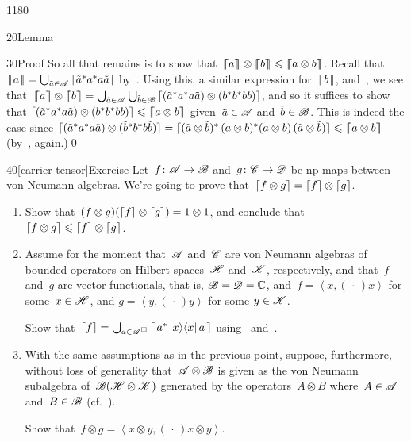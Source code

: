 \begin{parsec}{1180}
\begin{point}{20}{Lemma}
\begin{point}{30}{Proof}
So all that remains is to show that~$\cceil{a}\otimes\cceil{b}
\leq \cceil{a\otimes b}$.
Recall that~$\left\lceil\!\!\left\lceil a\right\rceil\!\!\right\rceil= \bigcup_{\tilde{a}\in\mathscr{A}}
\left\lceil\tilde{a}^* a^*a\tilde{a}\right\rceil$
by~.
Using this,  a similar
expression for~$\left\lceil\!\!\left\lceil b\right\rceil\!\!\right\rceil$,
and~,
we see that~$\cceil{a}\otimes \cceil{b}
=\bigcup_{\tilde{a}\in\scrA}
\bigcup_{\tilde{b}\in\scrB}
\ceil{ \smash{(\tilde{a}^*a^*a\tilde{a})
\otimes (\tilde{b}^*b^*b\tilde{b})} }$,
and so it suffices to show that 
$\left\lceil\smash{(\tilde{a}^*a^*a\tilde{a})
\otimes (\tilde{b}^*b^*b \tilde{b})}\right\rceil
\leqslant \left\lceil\!\!\left\lceil a\otimes b\right\rceil\!\!\right\rceil$
given~$\tilde{a}\in\mathscr{A}$
and~$\tilde{b}\in\mathscr{B}$.
This is indeed the case
since
$\left\lceil\smash{(\tilde{a}^*a^*a\tilde{a})
\otimes (\tilde{b}^*b^*b \tilde{b})}\right\rceil 
=
\left\lceil\smash{(\tilde{a}\otimes\tilde{b})^*\,
	(a \otimes b)^*(a\otimes b) \,
(\tilde{a}\otimes \tilde{b})}\right\rceil
\leqslant \left\lceil\!\!\left\lceil a\otimes b\right\rceil\!\!\right\rceil$
(by~, again.)\qed
\end{point}
\end{point}
\begin{point}{40}[carrier-tensor]{Exercise}%
Let~$f\colon \mathscr{A}\to\mathscr{B}$
and~$g\colon \mathscr{C}\to\mathscr{D}$ be np-maps
between von Neumann algebras.
We're going to prove that~$\left\lceil f\otimes g\right\rceil
=\left\lceil f\right\rceil\otimes \left\lceil g\right\rceil$.
\begin{enumerate}
\item
Show that~$(f\otimes g)(\left\lceil f\right\rceil\otimes\left\lceil g\right\rceil)=1\otimes 1$,
and conclude that~$\left\lceil f\otimes g\right\rceil \leqslant\left\lceil f\right\rceil\otimes\left\lceil g\right\rceil$.
\item
Assume for the moment that~$\mathscr{A}$
and~$\mathscr{C}$ are von Neumann algebras
of bounded operators on Hilbert spaces~$\mathscr{H}$
and~$\mathscr{K}$, respectively,
and that~$f$ and~$g$ are vector functionals,
that is, $\mathscr{B}=\mathscr{D}=\mathbb{C}$,
and~$f=\left<x,(\,\cdot\,)x\right>$
for some~$x\in\mathscr{H}$,
and
$g=\left<y,(\,\cdot\,)y\right>$
for some
$y\in \mathscr{K}$.

Show that~$\left\lceil f\right\rceil=\bigcup_{a\in\mathscr{A}^\square}
\left\lceil\,a^* \left|x\right>\!\left<x\right| a\,\right\rceil$
using~
and~.

\item
With the same assumptions as in the previous
point,
suppose, furthermore, without loss of generality
that~$\mathscr{A}\otimes \mathscr{B}$
is
given as the von Neumann subalgebra of~$\mathscr{B}(\mathscr{H}\otimes \mathscr{K})$
generated by the operators~$A\otimes B$
where~$A\in\mathscr{A}$ and~$B\in\mathscr{B}$
(cf.~).

Show that~$f\otimes g = \left<x\otimes y,(\,\cdot\,)x\otimes y\right>$.


\end{enumerate}
\end{point}
\end{parsec}
